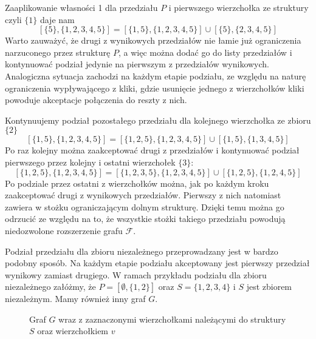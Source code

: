  Zaaplikowanie własności 1 dla przedziału $P$ i pierwszego wierzchołka ze struktury czyli $\{1\}$ daje nam 
$$[\{5\},\{1,2,3,4,5\}] = [\{1,5\},\{1,2,3,4,5\}] \cup [\{5\},\{2,3,4,5\}]$$ 
Warto zauważyć, że drugi z wynikowych przedziałów nie łamie już ograniczenia narzuconego przez strukturę $P$, a więc można dodać go do listy przedziałów i kontynuować podział jedynie na pierwszym z przedziałów wynikowych. Analogiczna sytuacja zachodzi na każdym etapie podziału, ze względu na naturę ograniczenia wypływającego z kliki, gdzie usunięcie jednego z wierzchołków kliki powoduje akceptacje połączenia do reszty z nich. 

Kontynuujemy podział pozostałego przedziału dla kolejnego wierzchołka ze zbioru $\{2\}$
$$[\{1,5\},\{1,2,3,4,5\}] = [\{1,2,5\},\{1,2,3,4,5\}] \cup [\{1,5\},\{1,3,4,5\}]$$ 
Po raz kolejny można zaakceptować drugi z przedziałów i kontynuować podział pierwszego przez kolejny i ostatni wierzchołek $\{3\}$: 
$$[\{1,2,5\},\{1,2,3,4,5\}] = [\{1,2,3,5\},\{1,2,3,4,5\}] \cup [\{1,2,5\},\{1,2,4,5\}]$$
Po podziale przez ostatni z wierzchołków można, jak po każdym kroku zaakceptować drugi z wynikowych przedziałów. Pierwszy z nich natomiast zawiera w stożku ograniczającym dolnym strukturę. Dzięki temu można go odrzucić ze względu na to, że wszystkie stożki takiego przedziału powodują niedozwolone rozszerzenie grafu $\mathcal{F}$.

Podział przedziału dla zbioru niezależnego przeprowadzany jest w bardzo podobny sposób. Na każdym etapie podziału akceptowany jest pierwszy przedział wynikowy zamiast drugiego. W ramach przykładu podziału dla zbioru niezależnego załóżmy, że 
$P = [\emptyset,\{1,2\}]$ oraz $S = \{1,2,3,4\}$ i $S$ jest zbiorem niezależnym. Mamy również inny graf $G$.
\begin{figure}[H]
  \centering
    \caption{Graf $G$ wraz z zaznaczonymi wierzchołkami należącymi do struktury $S$ oraz wierzchołkiem $v$}
 \end{figure}
 

